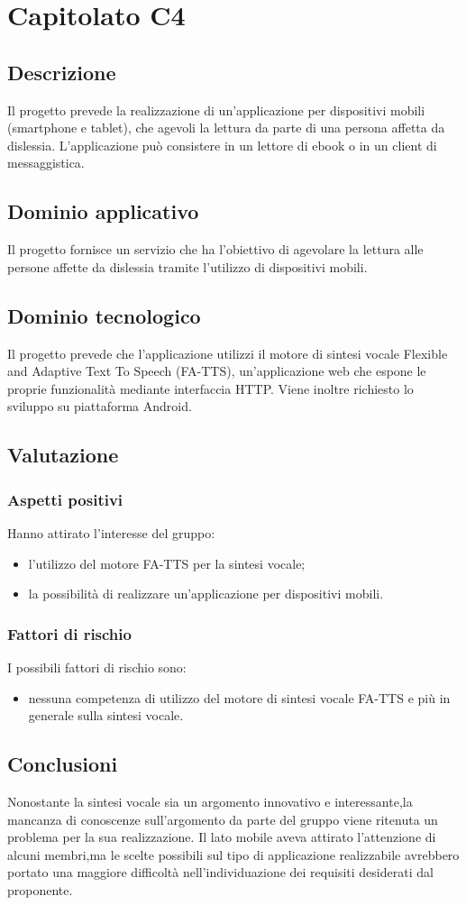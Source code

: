 \section {Capitolato C4}
	\subsection {Descrizione}
	Il progetto prevede la realizzazione di un'applicazione per dispositivi mobili (smartphone e tablet), che agevoli la
lettura da parte di una persona affetta da dislessia.  L'applicazione può consistere in un lettore di ebook o in un
client di messaggistica.
	\subsection {Dominio applicativo}
	Il progetto fornisce un servizio che ha l'obiettivo di agevolare la lettura alle persone affette da dislessia tramite l'utilizzo di dispositivi mobili. 
	\subsection {Dominio tecnologico}
Il progetto prevede che l'applicazione utilizzi il motore di sintesi vocale Flexible and Adaptive Text To Speech (FA-TTS), un'applicazione web che
espone le proprie funzionalità mediante interfaccia HTTP. Viene inoltre richiesto lo sviluppo su piattaforma Android.
	\subsection {Valutazione}
			\subsubsection {Aspetti positivi}
			Hanno attirato l'interesse del gruppo:
				\begin {itemize}
				  \item l'utilizzo del motore FA-TTS per la sintesi vocale;
				  \item la possibilità di realizzare un'applicazione per dispositivi mobili.		
				\end {itemize}
			\subsubsection {Fattori di rischio}
			I possibili fattori di rischio sono:
				\begin {itemize}
					\item nessuna competenza di utilizzo del motore di sintesi vocale FA-TTS e più in generale sulla sintesi vocale.
				\end {itemize}
	\subsection {Conclusioni}
		Nonostante la sintesi vocale sia un argomento innovativo e interessante,la mancanza di conoscenze sull'argomento da parte del gruppo viene ritenuta un problema per la sua realizzazione. Il lato mobile aveva attirato l'attenzione di alcuni membri,ma le scelte possibili sul tipo di applicazione realizzabile avrebbero portato una maggiore difficoltà nell'individuazione dei requisiti desiderati dal proponente.